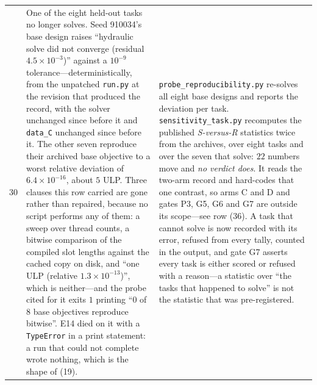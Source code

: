\documentclass{article}
\begin{document}
\begin{table}[p]
\begin{tabular}{@{}p{0.6cm}p{7.3cm}p{7.3cm}@{}}
30 & One of the eight held-out tasks no longer solves.  Seed 910034's base design raises ``hydraulic solve did not converge (residual $4.5\times10^{-3}$)'' against a $10^{-9}$ tolerance---deterministically, from the unpatched \texttt{run.py} at the revision that produced the record, with the solver unchanged since before it and \texttt{data\_C} unchanged since before it.  The other seven reproduce their archived base objective to a worst relative deviation of $6.4\times10^{-16}$, about $5$ ULP.  Three clauses this row carried are gone rather than repaired, because no script performs any of them: a sweep over thread counts, a bitwise comparison of the compiled slot lengths against the cached copy on disk, and ``one ULP (relative $1.3\times10^{-13}$)'', which is neither---and the probe cited for it exits $1$ printing ``$0$ of $8$ base objectives reproduce bitwise''.  E14 died on it with a \texttt{TypeError} in a print statement: a run that could not complete wrote nothing, which is the shape of (19). & \texttt{probe\_reproducibility.py} re-solves all eight base designs and reports the deviation per task.  \texttt{sensitivity\_task.py} recomputes the published \emph{S-versus-R} statistics twice from the archives, over eight tasks and over the seven that solve: $22$ numbers move and \emph{no verdict does}.  It reads the two-arm record and hard-codes that one contrast, so arms C and D and gates P3, G5, G6 and G7 are outside its scope---see row (36).  A task that cannot solve is now recorded with its error, refused from every tally, counted in the output, and gate G7 asserts every task is either scored or refused with a reason---a statistic over ``the tasks that happened to solve'' is not the statistic that was pre-registered. \\

\end{tabular}
\end{table}
\end{document}
